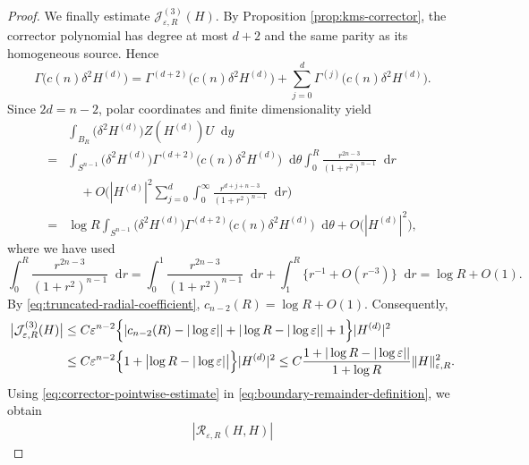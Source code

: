 \documentclass[11pt]{article}
\numberwithin{equation}{section}
\theoremstyle{remark}
\newcommand{\Sph}{S}
\newcommand{\dd}{\mathop{}\!\mathrm{d}}
\begin{document}
\begin{proof}
We finally estimate $\mathcal J_{\varepsilon,R}^{(3)}(H)$.  By
Proposition  \ref{prop:kms-corrector}, the corrector polynomial has
degree at most $d+2$ and the  same parity as its homogeneous source.
Hence
{
\begin{equation*}
 \Gamma\bigg(c(n)\delta^2H^{(d)}\bigg)
 =
 \Gamma^{(d+2)}\bigg(c(n)\delta^2H^{(d)}\bigg)
 +\sum_{j=0}^{d}\Gamma^{(j)}\bigg(c(n)\delta^2H^{(d)}\bigg).
\end{equation*}
}
Since $2d=n-2$, polar coordinates and finite dimensionality yield
{
\begin{equation*}
\begin{aligned}
 &\int_{B_R}\bigg(\delta^2H^{(d)}\bigg)Z(H^{(d)})U\dd y\\
 {}={}&\int_{\Sph^{n-1}}\bigg(\delta^2H^{(d)}\bigg)
 \Gamma^{(d+2)}\bigg(c(n)\delta^2H^{(d)}\bigg)\dd\theta
 \int_0^R\frac{r^{2n-3}}{(1+r^2)^{n-1}}\dd r\\
 &\quad+O\bigg(|H^{(d)}|^2\sum_{j=0}^{d}
 \int_0^\infty\frac{r^{d+j+n-3}}{(1+r^2)^{n-1}}\dd r\bigg)\\
 {}={}&\log R\int_{\Sph^{n-1}}\bigg(\delta^2H^{(d)}\bigg)
 \Gamma^{(d+2)}\bigg(c(n)\delta^2H^{(d)}\bigg)\dd\theta
 +O\bigl(|H^{(d)}|^2\bigr),
\end{aligned}
\end{equation*}
}
where we have used
{
\begin{equation*}
 \int_0^R\frac{r^{2n-3}}{(1+r^2)^{n-1}}\dd r
 =\int_0^1\frac{r^{2n-3}}{(1+r^2)^{n-1}}\dd r
 +\int_1^R\bigl\{r^{-1}+O(r^{-3})\bigr\}\dd r
 =\log R+O(1).
\end{equation*}
}
By \eqref{eq:truncated-radial-coefficient},
$c_{n-2}(R)=\log R+O(1)$.  Consequently,
{
\begin{equation*}
\begin{aligned}
 \bigl|\mathcal J_{\varepsilon,R}^{(3)}(H)\bigr|
 &\le C\varepsilon^{n-2}\Bigl\{
 |c_{n-2}(R)-|\log\varepsilon||
 +|\log R-|\log\varepsilon||+1\Bigr\}|H^{(d)}|^2\\
 &\le C\varepsilon^{n-2}
 \Bigl\{1+\bigl|\log R-|\log\varepsilon|\bigr|\Bigr\}|H^{(d)}|^2
 \le C\frac{1+|\log R-|\log\varepsilon||}{1+\log R}
 \|H\|_{\varepsilon,R}^2.
\end{aligned}
\end{equation*}
}
Using \eqref{eq:corrector-pointwise-estimate} in
\eqref{eq:boundary-remainder-definition}, we obtain
{
\begin{equation}\label{eq:boundary-remainder-estimate}
\begin{aligned}
 |\mathcal R_{\varepsilon,R}(H,H)|

\end{aligned}
\end{equation}}
\end{proof}
\end{document}
